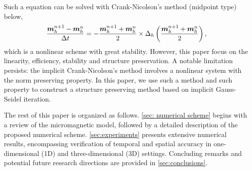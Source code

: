 \documentclass[preprint,times,3p]{elsarticle}
\def\m{\mbox{\boldmath $m$}}
\begin{document}
Such a equation can be solved with Crank-Nicolson's method (midpoint type) below,
\begin{align*}
    \frac{\m_h^{n+1}-\m_h^n}{\Delta t}=-\frac{\m_h^{n+1}+\m_h^n}{2}\times \Delta_h \left(\frac{\m_h^{n+1}+\m_h^n}{2}\right),
\end{align*}
which is a nonlinear scheme with great stability. However, this paper focus on the linearity, efficiency, stability and structure preservation. 
A notable limitation persists: the implicit Crank-Nicolson's method \cite{JEONG2010613} involves a nonlinear system with the norm preserving property. In this paper, we use such a method and such property to construct a structure preserving method based on implicit Gauss-Seidel iteration.

The rest of this paper is organized as follows. \cref{sec: numerical scheme} begins with a review of the micromagnetic model, followed by a detailed description of the proposed numerical scheme. \cref{sec:experiments} presents extensive numerical results, encompassing verification of temporal and spatial accuracy in one-dimensional (1D) and three-dimensional (3D) settings. 
Concluding remarks and potential future research directions are provided in \cref{sec:conclusions}.
\end{document}
